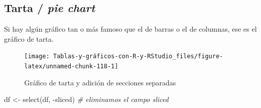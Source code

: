 \documentclass[
]{book}
\newenvironment{Shaded}{\begin{snugshade}}{\end{snugshade}}
\newcommand{\AttributeTok}[1]{\textcolor[rgb]{0.77,0.63,0.00}{#1}}
\newcommand{\CommentTok}[1]{\textcolor[rgb]{0.56,0.35,0.01}{\textit{#1}}}
\newcommand{\ConstantTok}[1]{\textcolor[rgb]{0.00,0.00,0.00}{#1}}
\newcommand{\DecValTok}[1]{\textcolor[rgb]{0.00,0.00,0.81}{#1}}
\newcommand{\FunctionTok}[1]{\textcolor[rgb]{0.00,0.00,0.00}{#1}}
\newcommand{\NormalTok}[1]{#1}
\newcommand{\OtherTok}[1]{\textcolor[rgb]{0.56,0.35,0.01}{#1}}
\newcommand{\SpecialCharTok}[1]{\textcolor[rgb]{0.00,0.00,0.00}{#1}}
\newcommand{\StringTok}[1]{\textcolor[rgb]{0.31,0.60,0.02}{#1}}
\begin{document}
\hypertarget{tarta-pie-chart}{%
\subsection{\texorpdfstring{Tarta / \emph{pie chart}}{Tarta / pie chart}}\label{tarta-pie-chart}}

Si hay algún gráfico tan o más famoso que el de barras o el de columnas, ese es el gráfico de tarta.

\begin{Shaded}
\end{Shaded}

\begin{figure}[H]

{\centering \texttt{[image: Tablas-y-gráficos-con-R-y-RStudio\_files/figure-latex/unnamed-chunk-118-1]} 

}

\caption{Gráfico de tarta y adición de secciones separadas}\label{fig:unnamed-chunk-118}
\end{figure}

\begin{Shaded}
\begin{Highlighting}[]
\NormalTok{df }\OtherTok{\textless{}{-}} \FunctionTok{select}\NormalTok{(df, }\SpecialCharTok{{-}}\NormalTok{sliced)}
\CommentTok{\# eliminamos el campo sliced}
\end{Highlighting}
\end{Shaded}
\end{document}
